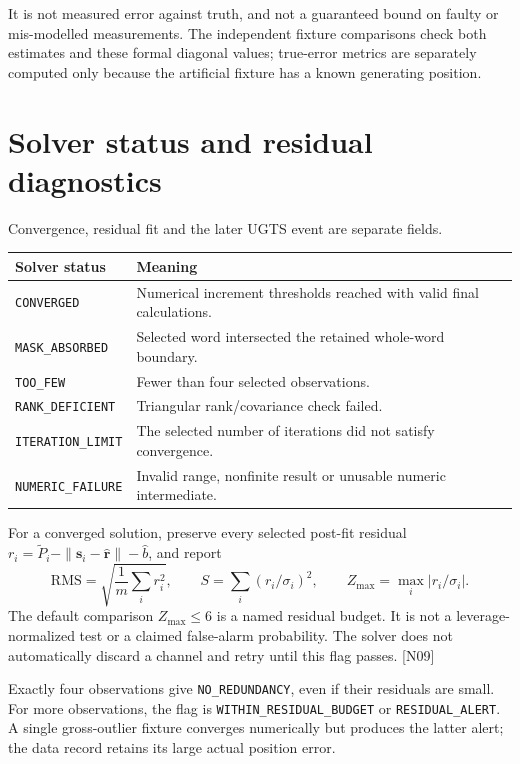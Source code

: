 \documentclass[11pt,a4paper]{article}
\newcommand{\code}[1]{\texttt{#1}}
\newcommand{\dec}[1]{\textcolor{accent}{[N#1]}}
\begin{document}
It is not measured error against truth, and not a guaranteed bound on faulty or
mis-modelled measurements. The independent fixture comparisons check both estimates
and these formal diagonal values; true-error metrics are separately computed only
because the artificial fixture has a known generating position.
\clearpage

\section{Solver status and residual diagnostics}
Convergence, residual fit and the later UGTS event are separate fields.
\par\small
\begin{tabularx}{\textwidth}{@{}P{.35\textwidth}Y@{}}\toprule
\textbf{Solver status} & \textbf{Meaning}\\\midrule
\code{CONVERGED} & Numerical increment thresholds reached with valid final calculations.\\
\code{MASK\_ABSORBED} & Selected word intersected the retained whole-word boundary.\\
\code{TOO\_FEW} & Fewer than four selected observations.\\
\code{RANK\_DEFICIENT} & Triangular rank/covariance check failed.\\
\code{ITERATION\_LIMIT} & The selected number of iterations did not satisfy convergence.\\
\code{NUMERIC\_FAILURE} & Invalid range, nonfinite result or unusable numeric intermediate.\\\bottomrule
\end{tabularx}
\par\normalsize

For a converged solution, preserve every selected post-fit residual
$r_i=\widetilde P_i-\|\boldsymbol s_i-\widehat{\boldsymbol r}\|-\widehat b$,
and report
\begin{equation}
\mathrm{RMS}=\sqrt{\frac1m\sum_i r_i^2},\qquad
S=\sum_i(r_i/\sigma_i)^2,\qquad
Z_{\max}=\max_i|r_i/\sigma_i|.
\end{equation}
The default comparison $Z_{\max}\le6$ is a named residual budget. It is not a
leverage-normalized test or a claimed false-alarm probability. The solver does not
automatically discard a channel and retry until this flag passes. \dec{09}

Exactly four observations give \code{NO\_REDUNDANCY}, even if their residuals are
small. For more observations, the flag is \code{WITHIN\_RESIDUAL\_BUDGET} or
\code{RESIDUAL\_ALERT}. A single gross-outlier fixture converges numerically but
produces the latter alert; the data record retains its large actual position error.
\end{document}
